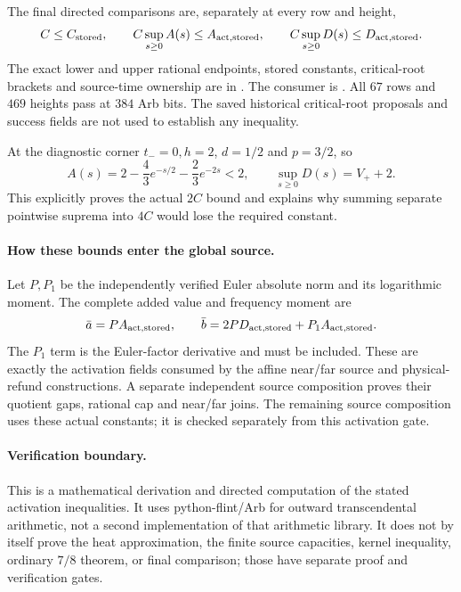 \documentclass[11pt,a4paper]{article}
\theoremstyle{definition}
\theoremstyle{remark}
\begin{document}
The final directed comparisons are, separately at every row and height,
\[
 C\le C_{\rm stored},\qquad
 C\sup_{s\ge0}A(s)\le A_{{\rm act},{\rm stored}},\qquad
 C\sup_{s\ge0}D(s)\le D_{{\rm act},{\rm stored}}.
\]
The exact lower and upper rational endpoints, stored constants,
critical-root brackets and source-time ownership are in
.
The consumer is . All $67$ rows and $469$ heights
pass at $384$ Arb bits. The saved historical critical-root proposals and
success fields are not used to establish any inequality.

At the diagnostic corner $t_-=0,h=2$, $d=1/2$ and $p=3/2$, so
\[
 A(s)=2-\frac43e^{-s/2}-\frac23e^{-2s}<2,
 \qquad \sup_{s\ge0}D(s)=V_++2.
\]
This explicitly proves the actual $2C$ bound and explains why summing
separate pointwise suprema into $4C$ would lose the required constant.

\paragraph{How these bounds enter the global source.}
Let $P,P_1$ be the independently verified Euler absolute norm and its
logarithmic moment. The complete added value and frequency moment are
\[
 \bar a=P A_{{\rm act},{\rm stored}},\qquad
 \bar b=2P D_{{\rm act},{\rm stored}}
                              +P_1 A_{{\rm act},{\rm stored}}.
\]
The $P_1$ term is the Euler-factor derivative and must be included.
These are exactly the activation fields consumed by the affine near/far
source and physical-refund constructions. A separate independent source
composition proves their quotient gaps, rational cap and near/far joins.
The remaining source composition uses these actual constants; it is
checked separately from this activation gate.

\paragraph{Verification boundary.}
This is a mathematical derivation and directed computation
of the stated activation inequalities. It uses python-flint/Arb for
outward transcendental arithmetic, not a second implementation of that
arithmetic library. It does not by itself prove the heat approximation,
the finite source capacities, kernel inequality, ordinary $7/8$ theorem,
or final comparison; those have separate proof and verification gates.
\end{document}
